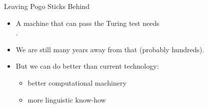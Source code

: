 \documentclass[xcolor={usenames,svgnames,x11names,dvipsnames,table}]{beamer}
\begin{document}
\begin{frame}{Leaving Pogo Sticks Behind}
    \begin{itemize}
        \item A machine that can pass the Turing test needs\\
            .
        \item We are still many years away from that (probably hundreds).
        \item But we can do better than current technology:
            \begin{itemize}
                \item better computational machinery
                \item more linguistic know-how
            \end{itemize}
    \end{itemize}
\end{frame}

\appendix

\end{document}
